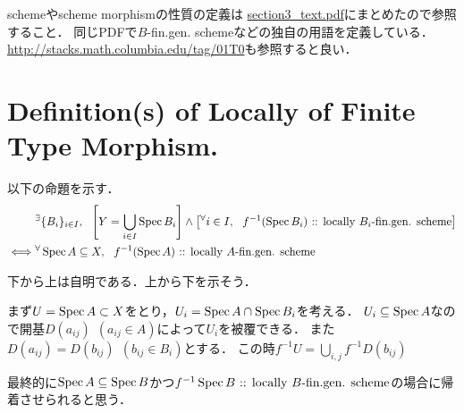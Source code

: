\documentclass[a4paper]{jsarticle}
\begin{document}
    schemeやscheme morphismの性質の定義は
    \url{section3_text.pdf}にまとめたので参照すること．
    同じPDFで$B$-fin.gen. schemeなどの独自の用語を定義している．
    \url{http://stacks.math.columbia.edu/tag/01T0}も参照すると良い．

\section{Definition(s) of Locally of Finite Type Morphism.} %
以下の命題を示す．
\begin{align*}
    {}&
    {}^{\exists} \{B_i\}_{i \in I},~~
    \left[Y=\bigcup_{i \in I} \operatorname{Spec} B_i\right] \land \left[{}^{\forall} i \in I,~~ f^{-1}(\operatorname{Spec} B_i)\text{ :: locally $B_i$-fin.gen. scheme}\right] \\
    \iff&
    {}^{\forall} \operatorname{Spec} A \subseteq X,~~ f^{-1}(\operatorname{Spec} A)\text{ :: locally $A$-fin.gen. scheme}
\end{align*}

下から上は自明である．上から下を示そう．

まず$U=\operatorname{Spec} A \subset X$をとり，$U_i=\operatorname{Spec} A \cap \operatorname{Spec} B_i$を考える．
$U_i \subseteq \operatorname{Spec} A$なので開基$D(a_{ij}) ~~(a_{ij} \in A)$によって$U_i$を被覆できる．
また$D(a_{ij})=D(b_{ij}) ~~(b_{ij} \in B_i)$とする．
この時$f^{-1} U=\bigcup_{i,j} f^{-1}D(b_{ij})$

最終的に$\operatorname{Spec} A \subseteq \operatorname{Spec} B$かつ$f^{-1}\operatorname{Spec} B\text{ :: locally $B$-fin.gen. scheme}$の場合に帰着させられると思う．

\section{ } %

\section{ } %

\section{ } %

\section{ } %

\section{ } %
\end{document}
